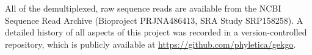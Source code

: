 All of the demultiplexed, raw sequence reads are available from the NCBI
Sequence Read Archive
(Bioproject PRJNA486413, SRA Study SRP158258).
A detailed history of all aspects of this project was recorded in a
version-controlled repository, which is publicly available at
\url{https://github.com/phyletica/gekgo}.
